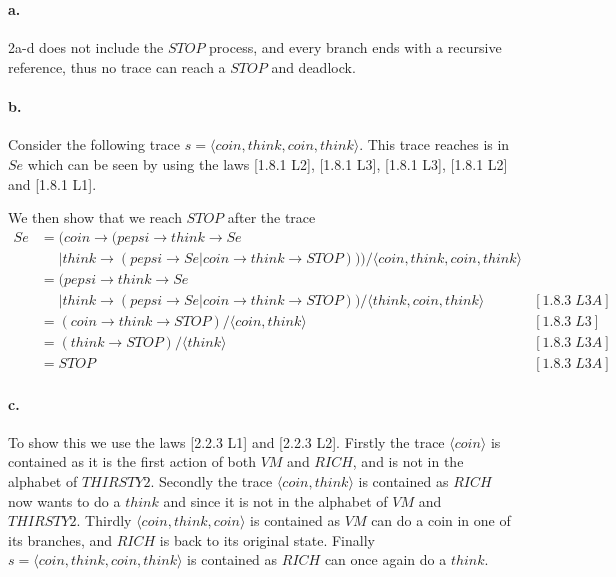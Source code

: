 \documentclass[a4paper, 11pt]{article}
\begin{document}

\section{} %

\paragraph{a.} %
\label{par:a_}
2a-d does not include the $STOP$ process, and every branch ends with a recursive reference, thus no trace can reach a $STOP$ and deadlock.

\paragraph{b.} %
\label{par:b_}
Consider the following trace $s = \langle coin, think, coin, think \rangle$. This trace reaches is in $Se$ which can be seen by using the laws [1.8.1 L2], [1.8.1 L3], [1.8.1 L3], [1.8.1 L2] and [1.8.1 L1].

We then show that we reach $STOP$ after the trace
\begin{align*}
Se &= (coin \rightarrow (pepsi \rightarrow think \rightarrow Se \\
   &\phantom{=} | think \rightarrow (pepsi \rightarrow Se | coin \rightarrow think \rightarrow STOP))) / \langle coin, think, coin, think \rangle \\
   &= (pepsi \rightarrow think \rightarrow Se \\
   &\phantom{=} | think \rightarrow (pepsi \rightarrow Se | coin \rightarrow think \rightarrow STOP)) / \langle think, coin, think \rangle & [1.8.3\;L3A] \\
   &= (coin \rightarrow think \rightarrow STOP) / \langle coin, think \rangle & [1.8.3\;L3] \\
   &= (think \rightarrow STOP) / \langle think \rangle & [1.8.3\;L3A] \\
   &= STOP & [1.8.3\;L3A] 
\end{align*}


\paragraph{c.} %
\label{par:c_}

To show this we use the laws [2.2.3 L1] and [2.2.3 L2]. Firstly the trace $\langle coin \rangle$ is contained as it is the first action of both $VM$ and $RICH$, and is not in the alphabet of $THIRSTY2$. Secondly the trace $\langle coin, think \rangle$ is contained as $RICH$ now wants to do a $think$ and since it is not in the alphabet of $VM$ and $THIRSTY2$. Thirdly $\langle coin, think, coin \rangle$ is contained as $VM$ can do a coin in one of its branches, and $RICH$ is back to its original state. Finally $s = \langle coin, think, coin, think \rangle$ is contained as $RICH$ can once again do a $think$.
\end{document}

